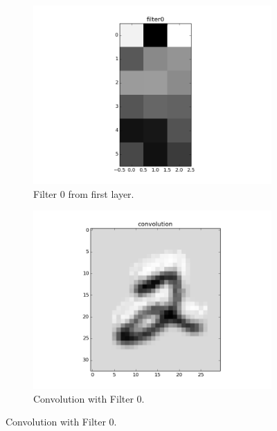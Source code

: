 \documentclass{article}
\begin{document}
\begin{figure}[h]
	\centering
	\begin{subfigure}[b]{0.45\textwidth} 
		\includegraphics[width=\textwidth]{graphics/aniso0.png}
		\caption{Filter 0 from first layer.}
		\label{fig11}
	\end{subfigure}
	\begin{subfigure}[b]{0.45\textwidth} 
		\includegraphics[width=\textwidth]{graphics/conv_aniso0.png}
		\caption{Convolution with Filter 0.}
		\label{fig12}
	\end{subfigure}
\end{figure}
\end{document}
